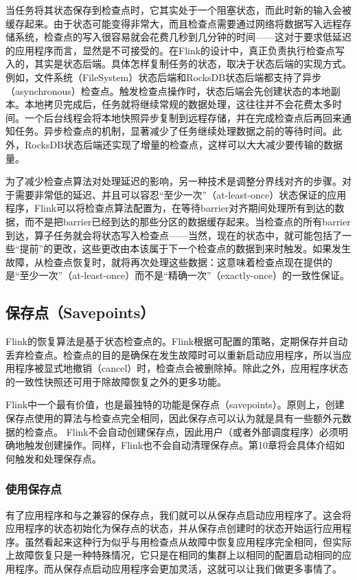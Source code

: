 \documentclass[oneside]{ctexbook}
\begin{document}
当任务将其状态保存到检查点时，它其实处于一个阻塞状态，而此时新的输入会被缓存起来。由于状态可能变得非常大，而且检查点需要通过网络将数据写入远程存储系统，检查点的写入很容易就会花费几秒到几分钟的时间——这对于要求低延迟的应用程序而言，显然是不可接受的。在Flink的设计中，真正负责执行检查点写入的，其实是状态后端。具体怎样复制任务的状态，取决于状态后端的实现方式。例如，文件系统（FileSystem）状态后端和RocksDB状态后端都支持了异步（asynchronous）检查点。触发检查点操作时，状态后端会先创建状态的本地副本。本地拷贝完成后，任务就将继续常规的数据处理，这往往并不会花费太多时间。一个后台线程会将本地快照异步复制到远程存储，并在完成检查点后再回来通知任务。异步检查点的机制，显著减少了任务继续处理数据之前的等待时间。此外，RocksDB状态后端还实现了增量的检查点，这样可以大大减少要传输的数据量。

为了减少检查点算法对处理延迟的影响，另一种技术是调整分界线对齐的步骤。对于需要非常低的延迟、并且可以容忍“至少一次”（at-least-once）状态保证的应用程序，Flink可以将检查点算法配置为，在等待barrier对齐期间处理所有到达的数据，而不是把barrier已经到达的那些分区的数据缓存起来。当检查点的所有barrier到达，算子任务就会将状态写入检查点——当然，现在的状态中，就可能包括了一些“提前”的更改，这些更改由本该属于下一个检查点的数据到来时触发。如果发生故障，从检查点恢复时，就将再次处理这些数据：这意味着检查点现在提供的是“至少一次”（at-least-once）而不是“精确一次”（exactly-once）的一致性保证。

\subsection{保存点（Savepoints）}

Flink的恢复算法是基于状态检查点的。Flink根据可配置的策略，定期保存并自动丢弃检查点。检查点的目的是确保在发生故障时可以重新启动应用程序，所以当应用程序被显式地撤销（cancel）时，检查点会被删除掉。除此之外，应用程序状态的一致性快照还可用于除故障恢复之外的更多功能。

Flink中一个最有价值，也是最独特的功能是保存点（savepoints）。原则上，创建保存点使用的算法与检查点完全相同，因此保存点可以认为就是具有一些额外元数据的检查点。 Flink不会自动创建保存点，因此用户（或者外部调度程序）必须明确地触发创建操作。同样，Flink也不会自动清理保存点。第10章将会具体介绍如何触发和处理保存点。

\subsubsection{使用保存点}

有了应用程序和与之兼容的保存点，我们就可以从保存点启动应用程序了。这会将应用程序的状态初始化为保存点的状态，并从保存点创建时的状态开始运行应用程序。虽然看起来这种行为似乎与用检查点从故障中恢复应用程序完全相同，但实际上故障恢复只是一种特殊情况，它只是在相同的集群上以相同的配置启动相同的应用程序。而从保存点启动应用程序会更加灵活，这就可以让我们做更多事情了。
\end{document}
